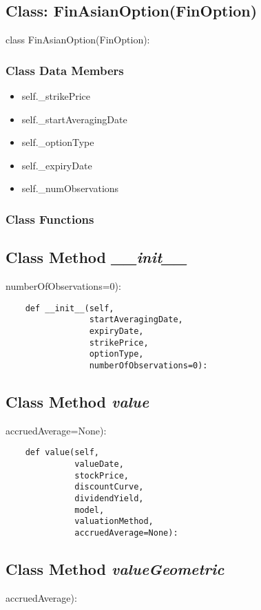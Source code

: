 \documentclass[twoside,11pt]{book}
\begin{document}
\subsection{Class: FinAsianOption(FinOption)}
class FinAsianOption(FinOption):

\subsubsection{Class Data Members}
\begin{itemize}
\item{self.\_strikePrice}
\item{self.\_startAveragingDate}
\item{self.\_optionType}
\item{self.\_expiryDate}
\item{self.\_numObservations}
\end{itemize}

\subsubsection{Class Functions}

\subsection{Class Method {\it \_\_init\_\_}}
numberOfObservations=0):

\begin{lstlisting}
    def __init__(self,
                 startAveragingDate,
                 expiryDate,
                 strikePrice,
                 optionType,
                 numberOfObservations=0):
\end{lstlisting}

\subsection{Class Method {\it value}}
accruedAverage=None):

\begin{lstlisting}
    def value(self,
              valueDate,
              stockPrice,
              discountCurve,
              dividendYield,
              model,
              valuationMethod,
              accruedAverage=None):
\end{lstlisting}

\subsection{Class Method {\it valueGeometric}}
accruedAverage):
\end{document}
